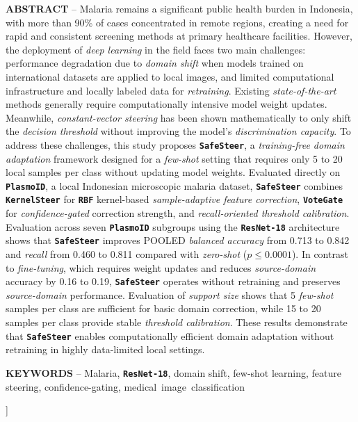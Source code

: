 \documentclass[conference]{IEEEtran}
\newcommand{\nama}[1]{\textbf{\texttt{#1}}}
\begin{document}
{\vspace{0.8em}
\noindent \textbf{ABSTRACT} -- Malaria remains a significant public health burden in Indonesia, with more than 90\% of cases concentrated in remote regions, creating a need for rapid and consistent screening methods at primary healthcare facilities. However, the deployment of \textit{deep learning} in the field faces two main challenges: performance degradation due to \textit{domain shift} when models trained on international datasets are applied to local images, and limited computational infrastructure and locally labeled data for \textit{retraining}. Existing \textit{state-of-the-art} methods generally require computationally intensive model weight updates. Meanwhile, \textit{constant-vector steering} has been shown mathematically to only shift the \textit{decision threshold} without improving the model's \textit{discrimination capacity}. To address these challenges, this study proposes \nama{SafeSteer}, a \textit{training-free domain adaptation} framework designed for a \textit{few-shot} setting that requires only 5 to 20 local samples per class without updating model weights. Evaluated directly on \nama{PlasmoID}, a local Indonesian microscopic malaria dataset, \nama{SafeSteer} combines \nama{KernelSteer} for \nama{RBF} kernel-based \textit{sample-adaptive feature correction}, \nama{VoteGate} for \textit{confidence-gated} correction strength, and \textit{recall-oriented threshold calibration}. Evaluation across seven \nama{PlasmoID} subgroups using the \nama{ResNet-18} architecture shows that \nama{SafeSteer} improves POOLED \textit{balanced accuracy} from 0.713 to 0.842 and \textit{recall} from 0.460 to 0.811 compared with \textit{zero-shot} ($p \leq 0.0001$). In contrast to \textit{fine-tuning}, which requires weight updates and reduces \textit{source-domain} accuracy by 0.16 to 0.19, \nama{SafeSteer} operates without retraining and preserves \textit{source-domain} performance. Evaluation of \textit{support size} shows that 5 \textit{few-shot} samples per class are sufficient for basic domain correction, while 15 to 20 samples per class provide stable \textit{threshold calibration}. These results demonstrate that \nama{SafeSteer} enables computationally efficient domain adaptation without retraining in highly data-limited local settings.
\vspace{0.8em}

\noindent \textbf{KEYWORDS} -- Malaria, \nama{ResNet-18}, domain shift, few-shot learning, feature steering, confidence-gating, \mbox{medical image classification}
}
\vspace{2em}
]
\end{document}
